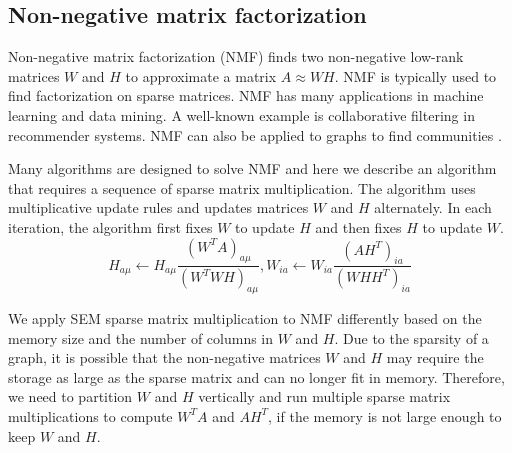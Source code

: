 \subsection{Non-negative matrix factorization}
Non-negative matrix factorization (NMF) \cite{nmf} finds two non-negative
low-rank matrices $W$ and $H$ to approximate a matrix $A \approx WH$. NMF is
typically used to find factorization on sparse matrices. NMF has many applications
in machine learning
and data mining. A well-known example is collaborative filtering \cite{cf} in
recommender systems. NMF can also be applied to graphs to find communities
\cite{yang13, wang11}.

Many algorithms are designed to solve NMF and here we describe an algorithm
\cite{nmf} that requires a sequence of sparse matrix multiplication.
The algorithm uses multiplicative update rules and updates matrices $W$ and $H$
alternately. In each iteration, the algorithm first fixes $W$ to update $H$
and then fixes $H$ to update $W$.
\begin{equation*}
H_{a\mu} \leftarrow H_{a\mu} \frac{{(W^TA)}_{a\mu}}{{(W^TWH)}_{a\mu}},
W_{ia} \leftarrow W_{ia} \frac{{(AH^T)}_{ia}}{{(WHH^T)}_{ia}}
\end{equation*}

We apply SEM sparse matrix multiplication to NMF differently
based on the memory size and the number of columns in $W$ and $H$. Due to
the sparsity of a graph, it is possible that the non-negative matrices $W$ and
$H$ may require the storage as large as the sparse matrix and can no longer fit in
memory. Therefore, we need to partition $W$ and $H$ vertically and run multiple
sparse matrix multiplications to compute $W^TA$ and $AH^T$, if the memory is not
large enough to keep $W$ and $H$.

